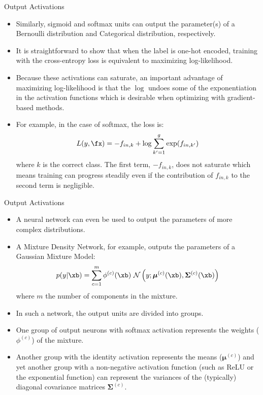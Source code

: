 \begin{frame} {Output Activations}
  \begin{itemize}
    \item Similarly, sigmoid and softmax units can output the parameter(s) of a Bernoulli distribution and Categorical distribution, respectively.
    \item It is straightforward to show that when the label is one-hot encoded, training with the cross-entropy loss is equivalent to maximizing log-likelihood. \href{https://www.quora.com/What-are-the-differences-between-maximum-likelihood-and-cross-entropy-as-a-loss-function}{}

    \item Because these activations can saturate, an important advantage of maximizing log-likelihood is that the $\log$ undoes some of the exponentiation in the activation functions which is desirable when optimizing with gradient-based methods.
    \item For example, in the case of softmax, the loss is:
    $$ L(y, \fx) = - f_{in,k} + \log {\sum_{k'=1}^g\exp(f_{in,k'})}$$ where $k$ is the correct class. The first term, $- f_{in,k}$, does not saturate which means training can progress steadily even if the contribution of $f_{in,k}$ to the second term is negligible.
  \end{itemize}
\end{frame}

\begin{frame} {Output Activations}
  \begin{itemize}
    \item A neural network can even be used to output the parameters of more complex distributions.
    \item A Mixture Density Network, for example, outputs the parameters of a Gaussian Mixture Model:
$$p(y | \xb)=\sum_{c=1}^{m} \phi^{(c)} (\xb) ~ \mathcal{N}\left(y ; \boldsymbol{\mu}^{(c)}(\xb), \boldsymbol{\Sigma}^{(c)}(\xb)\right)$$
          where $m$ the number of components in the mixture.
    \item In such a network, the output units are divided into groups.
    \item One group of output neurons with softmax activation represents the weights ($\phi^{(c)}$) of the mixture.
    \item Another group with the identity activation represents the means ($\boldsymbol{\mu}^{(c)}$) and yet another group with a non-negative activation function (such as ReLU or the exponential function) can represent the variances of the (typically) diagonal covariance matrices $\boldsymbol{\Sigma}^{(c)}$.
  \end{itemize}
\end{frame}

